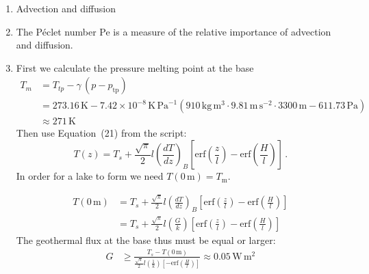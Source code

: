\documentclass[DIV15,11pt,parskip=half]{scrartcl}
\begin{document}
\begin{enumerate}
\item Advection and diffusion
\item The P\'eclet number Pe is a measure of the relative importance of advection and diffusion.
\item First we calculate the pressure melting point at the base
\begin{align*}
 \label{eq:clausius-pure}
 T_m &= T_{tp} - \gamma\, (p - p_{\text{tp}}) \\
 & = 273.16\,\text{K} -  7.42 \times 10^{-8} \,\text{K}\,\text{Pa}^{-1} \left(  910\,\text{kg}\,\text{m}^{3} \cdot 9.81\,\text{m}\,\text{s}^{-2}\cdot 3300\,\text{m}- 611.73\,\text{Pa}\right) \\
 & \approx 271\,\text{K}
\end{align*} Then use Equation~(21) from the script:
\begin{equation*}
  T(z) = T_s + \frac{\sqrt\pi}{2} l \left(\frac{dT}{dz}\right)_{B} 
 \left[ {\textrm{erf}} \left( \frac{z}{l} \right) - {\textrm{erf}} \left( \frac{H}{l} \right) \right]\,.
\end{equation*} In order for a lake to form we need $T(0\,\text{m}) = T_{\text{m}}$.

\begin{align*}
  T(0\,\text{m}) & = T_s + \frac{\sqrt\pi}{2} l \left(\frac{dT}{dz}\right)_{B} 
 \left[ {\textrm{erf}} \left( \frac{z}{l} \right) - {\textrm{erf}} \left( \frac{H}{l} \right) \right] \\
 & = T_s + \frac{\sqrt\pi}{2} l \left(\frac{G}{k}\right) 
 \left[ {\textrm{erf}} \left( \frac{z}{l} \right) - {\textrm{erf}} \left( \frac{H}{l} \right) \right]
\end{align*}
The geothermal flux at the base thus must be equal or larger:
\begin{align*}
 G & \ge \frac{T_s - T(0\,\text{m})}{\frac{\sqrt\pi}{2} l \left(\frac{1}{k}\right) 
 \left[  - {\textrm{erf}} \left( \frac{H}{l} \right) \right]} \approx 0.05\,\text{W}\,\text{m}^{2}
\end{align*}


\end{enumerate}
\end{document}
